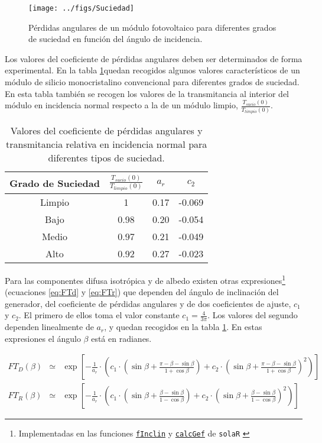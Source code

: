 %
\begin{figure}
\texttt{[image: ../figs/Suciedad]}

\caption{Pérdidas angulares de un módulo fotovoltaico para diferentes grados
de suciedad en función del ángulo de incidencia.\label{fig:PerdidasAngulares} }

\end{figure}


Los valores del coeficiente de pérdidas angulares deben ser determinados
de forma experimental. En la tabla \ref{tab:ar}quedan recogidos algunos
valores característicos de un módulo de silicio monocristalino convencional
para diferentes grados de suciedad. En esta tabla también se recogen
los valores de la transmitancia al interior del módulo en incidencia
normal respecto a la de un módulo limpio, $\frac{T_{sucio}(0)}{T_{limpio}(0)}$.

%
\begin{table}
\caption{Valores del coeficiente de pérdidas angulares y transmitancia relativa
en incidencia normal para diferentes tipos de suciedad.\label{tab:ar}}


\begin{tabular}{cccc}
\toprule 
Grado de Suciedad & $\frac{T_{sucio}(0)}{T_{limpio}(0)}$ & $a_{r}$ & $c_{2}$\tabularnewline
\midrule
\midrule 
Limpio & 1 & 0.17 & -0.069\tabularnewline
\midrule 
Bajo & 0.98 & 0.20 & -0.054\tabularnewline
\midrule 
Medio & 0.97 & 0.21 & -0.049\tabularnewline
\midrule 
Alto & 0.92 & 0.27 & -0.023\tabularnewline
\bottomrule
\end{tabular}
\end{table}


Para las componentes difusa isotrópica y de albedo existen otras
expresiones\footnote{Implementadas en las funciones
  \href{http://search.r-project.org/R/library/solaR/html/fInclin.html}{\texttt{fInclin}}
  y
  \href{http://search.r-project.org/R/library/solaR/html/calcGef.html}{\texttt{calcGef}}
  de \texttt{solaR} \cite{Perpinan2012b}}
(ecuaciones \ref{eq:FTd} y \ref{eq:FTr}) que dependen del ángulo
de inclinación del generador, del coeficiente de pérdidas angulares
y de dos coeficientes de ajuste, $c_{1}$y $c_{2}$. El primero de
ellos toma el valor constante $c_{1}=\frac{4}{3\pi}$. Los valores
del segundo dependen linealmente de $a_{r}$, y quedan recogidos en
la tabla \ref{tab:ar}. En estas expresiones el ángulo $\beta$ está
en radianes.

\begin{eqnarray}
FT_{D}(\beta) & \simeq & \exp[-\frac{1}{a_{r}}\cdot(c_{1}\cdot(\sin\beta+\frac{\pi-\beta-\sin\beta}{1+\cos\beta})+c_{2}\cdot(\sin\beta+\frac{\pi-\beta-\sin\beta}{1+\cos\beta})^{2})]\label{eq:FTd}\\
FT_{R}(\beta) & \simeq & \exp[-\frac{1}{a_{r}}\cdot(c_{1}\cdot(\sin\beta+\frac{\beta-\sin\beta}{1-\cos\beta})+c_{2}\cdot(\sin\beta+\frac{\beta-\sin\beta}{1-\cos\beta})^{2})]\label{eq:FTr}\end{eqnarray}

